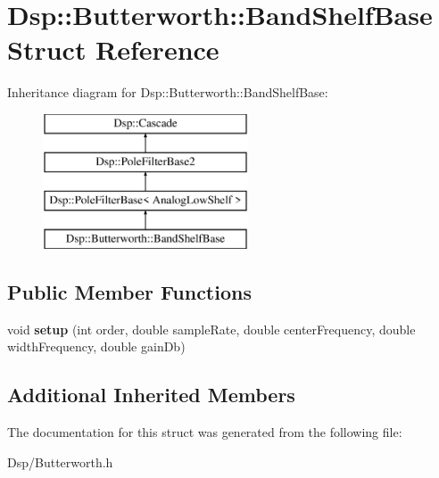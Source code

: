 \hypertarget{structDsp_1_1Butterworth_1_1BandShelfBase}{\section{Dsp\-:\-:Butterworth\-:\-:Band\-Shelf\-Base Struct Reference}
\label{structDsp_1_1Butterworth_1_1BandShelfBase}
}
Inheritance diagram for Dsp\-:\-:Butterworth\-:\-:Band\-Shelf\-Base\-:\begin{figure}[H]
\begin{center}
\leavevmode
\includegraphics[height=4.000000cm]{structDsp_1_1Butterworth_1_1BandShelfBase}
\end{center}
\end{figure}
\subsection*{Public Member Functions}
\begin{DoxyCompactItemize}
\item 
\hypertarget{structDsp_1_1Butterworth_1_1BandShelfBase_af4483c61acafaa610e787e7b9756ec89}{void {\bfseries setup} (int order, double sample\-Rate, double center\-Frequency, double width\-Frequency, double gain\-Db)}\label{structDsp_1_1Butterworth_1_1BandShelfBase_af4483c61acafaa610e787e7b9756ec89}

\end{DoxyCompactItemize}
\subsection*{Additional Inherited Members}


The documentation for this struct was generated from the following file\-:\begin{DoxyCompactItemize}
\item 
Dsp/Butterworth.\-h\end{DoxyCompactItemize}
